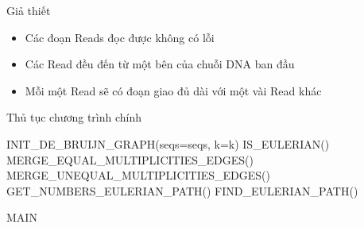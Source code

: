 \documentclass[10pt]{beamer}
\theoremstyle{remark}
\numberwithin{algocf}{section}
\numberwithin{equation}{section}
\numberwithin{dl}{section}
\numberwithin{figure}{section}
\begin{document}
\begin{frame}{Giả thiết}
    \begin{itemize}
        \item Các đoạn Reads đọc được không có lỗi
        \item Các Read đều đến từ một bên của chuỗi DNA ban đầu
        \item Mỗi một Read sẽ có đoạn giao đủ dài với một vài Read khác
    \end{itemize}
\end{frame}


\begin{frame}{Thủ tục chương trình chính}
    \begin{algorithm}[H]
        \DontPrintSemicolon
        INIT\_DE\_BRUIJN\_GRAPH(seqs=seqs, k=k)\;
        IS\_EULERIAN()\;
        MERGE\_EQUAL\_MULTIPLICITIES\_EDGES()\;
        MERGE\_UNEQUAL\_MULTIPLICITIES\_EDGES()\;
         {
            GET\_NUMBERS\_EULERIAN\_PATH()\;
            FIND\_EULERIAN\_PATH()\;
        }
        
        \caption{MAIN}
    \end{algorithm}
    
\end{frame}
\end{document}

